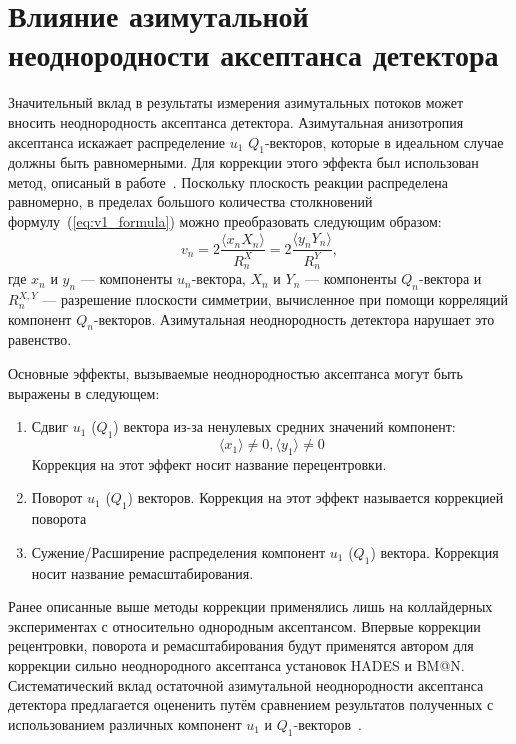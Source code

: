\section{Влияние азимутальной неоднородности аксептанса детектора}

Значительный вклад в результаты измерения азимутальных потоков может вносить неоднородность аксептанса детектора. 
Азимутальная анизотропия аксептанса искажает распределение $u_1$ $Q_1$-векторов, которые в идеальном случае должны быть равномерными. 
Для коррекции этого эффекта был использован метод, описаный в работе~\cite{Selyuzhenkov:2007zi}.
Поскольку плоскость реакции распределена равномерно, в пределах большого количества столкновений формулу~(\ref{eq:v1_formula}) можно преобразовать следующим образом:
%
\begin{equation}
    v_n =  2\frac{ \langle x_n X_n \rangle }{R_n^X} = 2\frac{ \langle y_n Y_n \rangle }{R_n^Y},
    \label{eq:v1_formula}
\end{equation}
%
где $x_n$ и $y_n$ --- компоненты $u_n$-вектора, $X_n$ и $Y_n$ --- компоненты $Q_n$-вектора и $R_n^{X,Y}$ --- разрешение плоскости симметрии, вычисленное при помощи корреляций компонент $Q_n$-векторов.
Азимутальная неоднородность детектора нарушает это равенство.

Основные эффекты, вызываемые неоднородностью аксептанса могут быть выражены в следующем:
\begin{enumerate}
    \item Сдвиг $u_1$ ($Q_1$) вектора из-за ненулевых средних значений компонент:
    \begin{equation}
        \langle x_1 \rangle \ne 0, \langle y_1 \rangle \ne 0
    \end{equation}
    Коррекция на этот эффект носит название перецентровки.
    \item Поворот $u_1$ ($Q_1$) векторов. Коррекция на этот эффект называется коррекцией поворота
    \item Сужение/Расширение распределения компонент $u_1$ ($Q_1$) вектора. Коррекция носит название ремасштабирования.
\end{enumerate}

Ранее описанные выше методы коррекции применялись лишь на коллайдерных экспериментах с относительно однородным аксептансом. 
Впервые коррекции рецентровки, поворота и ремасштабирования будут применятся автором для коррекции сильно неоднородного аксептанса установок HADES и BM@N.
Систематический вклад остаточной азимутальной неоднородности аксептанса детектора предлагается оцененить путём сравнением результатов полученных с использованием различных компонент $u_1$ и $Q_1$-векторов~\cite{Mamaev:2020qom,Mamaev:2023yhz}. 

